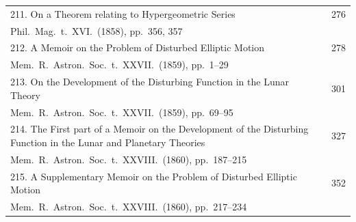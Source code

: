\documentclass[12pt,a4paper]{article}
\theoremstyle{plain}
\begin{document}
\begin{longtable}{p{}r}
%
211. On a Theorem relating to Hypergeometric Series \dotfill & 276 \\
\multicolumn{2}{l}{\small Phil.\ Mag.\ t.~XVI.\ (1858), pp.~356, 357} \\[0.5em]
%
212. A Memoir on the Problem of Disturbed Elliptic Motion \dotfill & 278 \\
\multicolumn{2}{l}{\small Mem.\ R.\ Astron.\ Soc.\ t.~XXVII.\ (1859), pp.~1--29} \\[0.5em]
%
213. On the Development of the Disturbing Function in the Lunar Theory \dotfill & 301 \\
\multicolumn{2}{l}{\small Mem.\ R.\ Astron.\ Soc.\ t.~XXVII.\ (1859), pp.~69--95} \\[0.5em]
%
214. The First part of a Memoir on the Development of the Disturbing Function in the Lunar and Planetary Theories \dotfill & 327 \\
\multicolumn{2}{l}{\small Mem.\ R.\ Astron.\ Soc.\ t.~XXVIII.\ (1860), pp.~187--215} \\[0.5em]
%
215. A Supplementary Memoir on the Problem of Disturbed Elliptic Motion \dotfill & 352 \\
\multicolumn{2}{l}{\small Mem.\ R.\ Astron.\ Soc.\ t.~XXVIII.\ (1860), pp.~217--234} \\[0.5em]
\bottomrule
\end{longtable}

\clearpage
\end{document}
